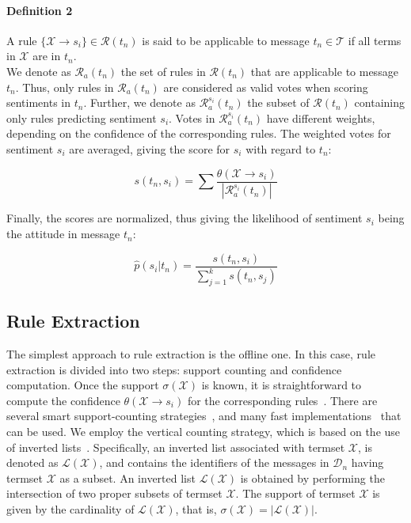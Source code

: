 \documentclass{sig-alternate}
\begin{document}
\paragraph*{\bf{Definition 2}} A rule $\{\mathcal{X}\xrightarrow{}s_i\}\in\mathcal{R}(t_n)$ is said to be applicable to message $t_n\in\mathcal{T}$ if
all terms in $\mathcal{X}$ are in $t_n$.\\

We denote as $\mathcal{R}_a(t_n)$ the set of rules in $\mathcal{R}(t_n)$ that are applicable to message $t_n$. Thus, only rules in $\mathcal{R}_a(t_n)$ are considered as valid votes when scoring sentiments in $t_n$.
Further, we denote as $\mathcal{R}^{s_i}_a(t_n)$ the subset of $\mathcal{R}(t_n)$ containing only rules predicting sentiment $s_i$.
Votes in $\mathcal{R}^{s_i}_a(t_n)$ have different weights, depending on the confidence of the corresponding rules. The weighted votes for sentiment $s_i$ are averaged, giving the score for $s_i$ with regard to $t_n$:

\begin{equation} \label{eq1}
s(t_n, s_i)=\displaystyle\sum \displaystyle\frac{\theta(\mathcal{X}\xrightarrow{}s_i)}{|\mathcal{R}^{s_i}_a(t_n)|}
\end{equation}

Finally, the scores are normalized, thus giving the likelihood of sentiment $s_i$ being the attitude in message $t_n$:

\begin{equation}
\label{eq:prob}
\hat{p}(s_i|t_n)=\displaystyle\frac{s(t_n, s_i)}{\displaystyle\sum^{k}_{j=1} s(t_n, s_j)}
\end{equation}

\subsection*{Rule Extraction}

The simplest approach to rule extraction is the offline one. In this case, rule extraction is divided into two steps: support counting and confidence computation. Once the support $\sigma(\mathcal{X})$ is known, it is straightforward to compute the confidence $\theta(\mathcal{X}\xrightarrow{}s_i)$ for the corresponding rules~\cite{eclat}.
There are several smart support-counting strategies~\cite{rules,fp,eclat}, and many fast implementations~\cite{fimi} that can be used.
We employ the vertical counting strategy, which is based on the use of inverted lists~\cite{vertical}.
Specifically, an inverted list associated with termset $\mathcal{X}$, is denoted as $\mathcal{L}(\mathcal{X})$, and contains the identifiers of the messages in $\mathcal{D}_n$ having termset $\mathcal{X}$ as a subset. An inverted list $\mathcal{L}(\mathcal{X})$ is obtained by performing the intersection of two proper subsets of termset $\mathcal{X}$. The support of termset $\mathcal{X}$ is given by the cardinality of $\mathcal{L}(\mathcal{X})$, that is, $\sigma(\mathcal{X})=|\mathcal{L}(\mathcal{X})|$.
\end{document}
